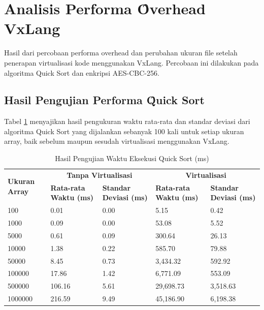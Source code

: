 \section{Analisis Performa \f{Overhead} VxLang}
Hasil dari percobaan performa overhead dan perubahan ukuran file setelah penerapan virtualisasi kode menggunakan VxLang. Percobaan ini dilakukan pada algoritma Quick Sort dan enkripsi AES-CBC-256.

\subsection{Hasil Pengujian Performa \f{Quick Sort}}
Tabel \ref{tab:quick_sort_performance} menyajikan hasil pengukuran waktu rata-rata dan standar deviasi dari algoritma Quick Sort yang dijalankan sebanyak 100 kali untuk setiap ukuran array, baik sebelum maupun sesudah virtualisasi menggunakan VxLang.

\begin{table}[htbp]
    \centering
    \caption{Hasil Pengujian Waktu Eksekusi Quick Sort (ms)}
    \label{tab:quick_sort_performance}
    \begin{tabularx}{\textwidth}{@{}|X|X|X|X|X|@{}}
    \hline
        \multirow{2}{*}{\textbf{Ukuran Array}} & \multicolumn{2}{c|}{\textbf{Tanpa Virtualisasi}} & \multicolumn{2}{c|}{\textbf{Virtualisasi}}\\
        \cline{2-5}
        & \textbf{Rata-rata Waktu (ms)} & \textbf{Standar Deviasi (ms)} & \textbf{Rata-rata Waktu (ms)} & \textbf{Standar Deviasi (ms)}\\
        \hline
        100                     & 0.01 & 0.00 & 5.15 & 0.42 \\
        \hline
        1000                    & 0.09 & 0.00 & 53.08 & 5.52 \\
        \hline
        5000                    & 0.61 & 0.09 & 300.64 & 26.13 \\
        \hline
        10000                   & 1.38 & 0.22 & 585.70 & 79.88 \\
        \hline
        50000                   & 8.45 & 0.73 & 3,434.32 & 592.92 \\
        \hline
        100000                  & 17.86 & 1.42 & 6,771.09 & 553.09 \\
        \hline
        500000                  & 106.16 & 5.61 & 29,698.73 & 3,518.63 \\
        \hline
        1000000                 & 216.59 & 9.49 & 45,186.90 & 6,198.38 \\
        \hline
    \end{tabularx}
\end{table}

